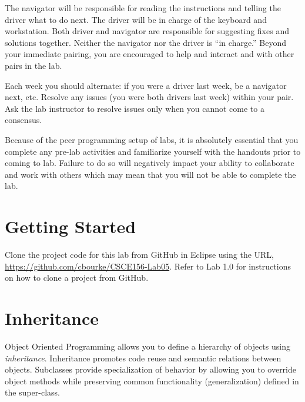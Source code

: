 \documentclass[12pt]{scrartcl}
\begin{document}
The navigator will be responsible for reading the instructions and
telling the driver what to do next.  The driver will be in charge of the
keyboard and workstation.  Both driver and navigator are responsible
for suggesting fixes and solutions together.  Neither the navigator
nor the driver is ``in charge.''  Beyond your immediate pairing, you
are encouraged to help and interact and with other pairs in the lab.

Each week you should alternate: if you were a driver last week, 
be a navigator next, etc.  Resolve any issues (you were both drivers
last week) within your pair.  Ask the lab instructor to resolve issues
only when you cannot come to a consensus.  

Because of the peer programming setup of labs, it is absolutely 
essential that you complete any pre-lab activities and familiarize
yourself with the handouts prior to coming to lab.  Failure to do
so will negatively impact your ability to collaborate and work with 
others which may mean that you will not be able to complete the
lab.  

\section*{Getting Started}

Clone the project code for this lab from GitHub in Eclipse using the
URL, \url{https://github.com/cbourke/CSCE156-Lab05}.
Refer to Lab 1.0 for instructions on how to clone a project from GitHub.

\section*{Inheritance}

Object Oriented Programming allows you to define a hierarchy of objects 
using \emph{inheritance}.  Inheritance promotes code reuse and semantic 
relations between objects.  Subclasses provide specialization of behavior 
by allowing you to override object methods while preserving common 
functionality (generalization) defined in the super-class.
\end{document}
